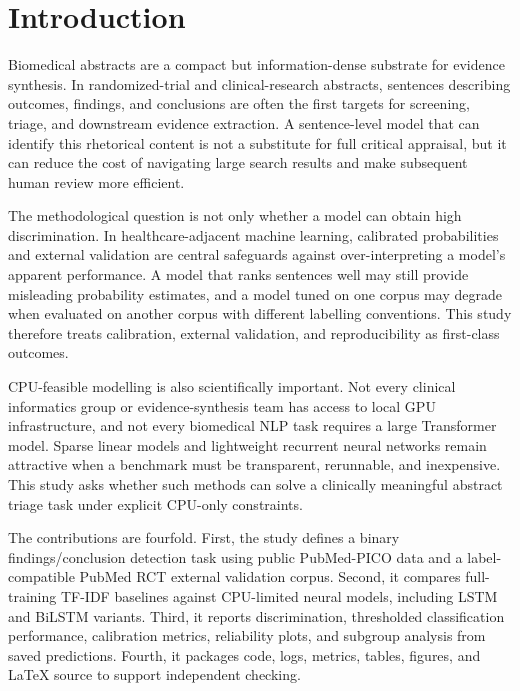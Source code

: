 \section*{Introduction}
Biomedical abstracts are a compact but information-dense substrate for evidence synthesis. In randomized-trial and clinical-research abstracts, sentences describing outcomes, findings, and conclusions are often the first targets for screening, triage, and downstream evidence extraction. A sentence-level model that can identify this rhetorical content is not a substitute for full critical appraisal, but it can reduce the cost of navigating large search results and make subsequent human review more efficient.

The methodological question is not only whether a model can obtain high discrimination. In healthcare-adjacent machine learning, calibrated probabilities and external validation are central safeguards against over-interpreting a model's apparent performance. A model that ranks sentences well may still provide misleading probability estimates, and a model tuned on one corpus may degrade when evaluated on another corpus with different labelling conventions. This study therefore treats calibration, external validation, and reproducibility as first-class outcomes.

CPU-feasible modelling is also scientifically important. Not every clinical informatics group or evidence-synthesis team has access to local GPU infrastructure, and not every biomedical NLP task requires a large Transformer model. Sparse linear models and lightweight recurrent neural networks remain attractive when a benchmark must be transparent, rerunnable, and inexpensive. This study asks whether such methods can solve a clinically meaningful abstract triage task under explicit CPU-only constraints.

The contributions are fourfold. First, the study defines a binary findings/conclusion detection task using public PubMed-PICO data and a label-compatible PubMed RCT external validation corpus. Second, it compares full-training TF-IDF baselines against CPU-limited neural models, including LSTM and BiLSTM variants. Third, it reports discrimination, thresholded classification performance, calibration metrics, reliability plots, and subgroup analysis from saved predictions. Fourth, it packages code, logs, metrics, tables, figures, and LaTeX source to support independent checking.
